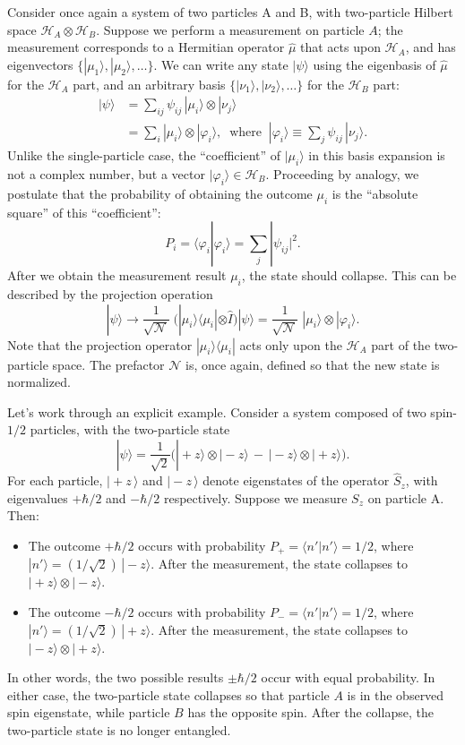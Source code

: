 \documentclass[pra,11pt]{revtex4}
\begin{document}
Consider once again a system of two particles A and B, with
two-particle Hilbert space $\mathscr{H}_A \otimes \mathscr{H}_B$.
Suppose we perform a measurement on particle $A$; the measurement
corresponds to a Hermitian operator $\hat{\mu}$ that acts upon
$\mathscr{H}_A$, and has eigenvectors $\{|\mu_1\rangle,
|\mu_2\rangle,\dots\}$.  We can write any state $|\psi\rangle$ using
the eigenbasis of $\hat{\mu}$ for the $\mathscr{H}_A$ part, and an
arbitrary basis $\{|\nu_1\rangle, |\nu_2\rangle,\dots\}$ for the
$\mathscr{H}_B$ part:
$$\begin{aligned}|\psi\rangle &= \sum_{ij} \psi_{ij}\, |\mu_i\rangle\otimes |\nu_j\rangle \\&= \sum_i |\mu_i\rangle\otimes |\varphi_i\rangle, \;\;\mathrm{where}\;\;|\varphi_i\rangle\equiv \sum_j \psi_{ij}\,|\nu_j\rangle.\end{aligned}$$
Unlike the single-particle case, the ``coefficient'' of
$|\mu_i\rangle$ in this basis expansion is not a complex number, but a
vector $|\varphi_i\rangle \in \mathscr{H}_B$.  Proceeding by analogy,
we postulate that the probability of obtaining the outcome $\mu_i$ is
the ``absolute square'' of this ``coefficient'':
$$P_i = \langle \varphi_i|\varphi_i\rangle = \sum_j |\psi_{ij}|^2.$$
After we obtain the measurement result $\mu_i$, the state should
collapse.  This can be described by the projection operation
$$|\psi\rangle \longrightarrow \frac{1}{\sqrt{\mathcal{N}}}\; \Big(|\mu_i\rangle\langle \mu_i| \otimes \hat{I}\Big) |\psi\rangle = \frac{1}{\sqrt{\mathcal{N}}}\; |\mu_i\rangle\otimes |\varphi_i\rangle.$$
Note that the projection operator $|\mu_i\rangle\langle \mu_i|$ acts
only upon the $\mathscr{H}_A$ part of the two-particle space.  The
prefactor $\mathcal{N}$ is, once again, defined so that the new state
is normalized.

Let's work through an explicit example.  Consider a system composed of
two spin-$1/2$ particles, with the two-particle state
$$|\psi\rangle = \frac{1}{\sqrt{2}} \Big(|\!+\!z\rangle\otimes|\!-\!z\rangle \,-\, |\!-\!z\rangle\otimes|\!+\!z\rangle\Big).$$
For each particle, $|\!+\!z\,\rangle$ and $|\!-\!z\,\rangle$ denote
eigenstates of the operator $\hat{S}_z$, with eigenvalues $+\hbar/2$
and $-\hbar/2$ respectively.  Suppose we measure $S_z$ on particle A.
Then:
\begin{itemize}
\item The outcome $+\hbar/2$ occurs with probability $P_+ = \langle
  n'|n'\rangle = 1/2$, where $|n'\rangle =
  (1/\sqrt{2})\,|\!-\!z\rangle$.  After the measurement, the state
  collapses to $|\!+\!z\rangle \otimes|\!-\!z\rangle$.

\item The outcome $-\hbar/2$ occurs with probability $P_- = \langle
  n'|n'\rangle = 1/2$, where $|n'\rangle =
  (1/\sqrt{2})\,|\!+\!z\rangle$.  After the measurement, the state
  collapses to $|\!-\!z\rangle \otimes|\!+\!z\rangle$.
\end{itemize}
In other words, the two possible results $\pm \hbar/2$ occur with
equal probability.  In either case, the two-particle state collapses
so that particle $A$ is in the observed spin eigenstate, while
particle $B$ has the opposite spin.  After the collapse, the
two-particle state is no longer entangled.
\end{document}
